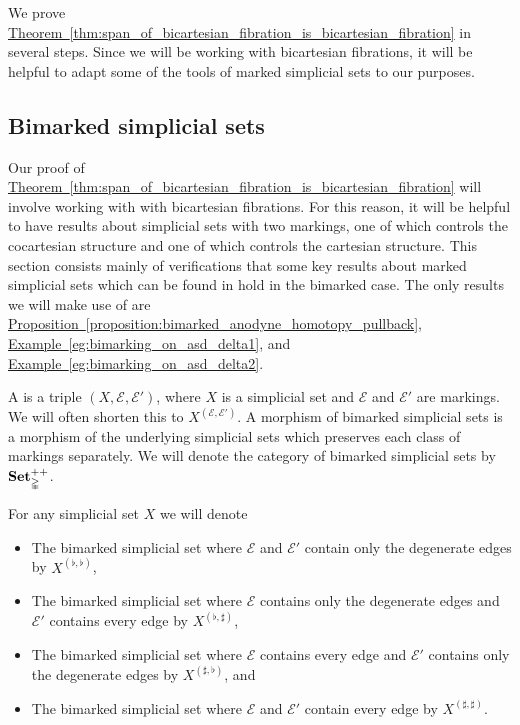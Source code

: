 \documentclass[main.tex]{subfiles}
\begin{document}
We prove \hyperref[thm:span_of_bicartesian_fibration_is_bicartesian_fibration]{Theorem~\ref*{thm:span_of_bicartesian_fibration_is_bicartesian_fibration}} in several steps. Since we will be working with bicartesian fibrations, it will be helpful to adapt some of the tools of marked simplicial sets to our purposes.

\subsection{Bimarked simplicial sets}
\label{ssc:bimarked_simplicial_sets}

Our proof of \hyperref[thm:span_of_bicartesian_fibration_is_bicartesian_fibration]{Theorem~\ref*{thm:span_of_bicartesian_fibration_is_bicartesian_fibration}} will involve working with with bicartesian fibrations. For this reason, it will be helpful to have results about simplicial sets with two markings, one of which controls the cocartesian structure and one of which controls the cartesian structure. This section consists mainly of verifications that some key results about marked simplicial sets which can be found in \cite[Sec.\ 3.1]{highertopostheory} hold in the bimarked case. The only results we will make use of are \hyperref[proposition:bimarked_anodyne_homotopy_pullback]{Proposition~\ref*{proposition:bimarked_anodyne_homotopy_pullback}}, \hyperref[eg:bimarking_on_asd_delta1]{Example~\ref*{eg:bimarking_on_asd_delta1}}, and \hyperref[eg:bimarking_on_asd_delta2]{Example~\ref*{eg:bimarking_on_asd_delta2}}.

\begin{definition}
  A  is a triple $(X, \mathcal{E}, \mathcal{E}')$, where $X$ is a simplicial set and $\mathcal{E}$ and $\mathcal{E}'$ are markings. We will often shorten this to $X^{(\mathcal{E}, \mathcal{E}')}$. A morphism of bimarked simplicial sets is a morphism of the underlying simplicial sets which preserves each class of markings separately. We will denote the category of bimarked simplicial sets by $\mathbf{Set}_{\mathbb{\Delta}}^{++}$.
\end{definition}

\begin{example}
  For any simplicial set $X$ we will denote
  \begin{itemize}
    \item The bimarked simplicial set where $\mathcal{E}$ and $\mathcal{E}'$ contain only the degenerate edges by $X^{( \flat, \flat )}$,

    \item The bimarked simplicial set where $\mathcal{E}$ contains only the degenerate edges and $\mathcal{E}'$ contains every edge by $X^{( \flat, \sharp )}$,

    \item The bimarked simplicial set where $\mathcal{E}$ contains every edge and $\mathcal{E}'$ contains only the degenerate edges by $X^{( \sharp, \flat )}$, and

    \item The bimarked simplicial set where $\mathcal{E}$ and $\mathcal{E}'$ contain every edge by $X^{( \sharp, \sharp )}$.
  \end{itemize}
\end{example}
\end{document}
